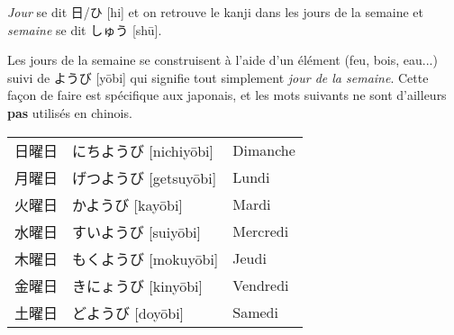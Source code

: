 \documentclass[a4paper,11pt,final]{article}
\newcommand{\sectit}[1]{\bigskip\hspace{-5mm}{\color{sectionblue}$\blacksquare$~~\Large\bfseries #1}}
\newcommand{\romaji}[1]{{\footnotesize[#1]}}
\begin{document}

\vspace{15mm}


\og\textit{Jour}\fg{} se dit 日/ひ \romaji{hi} et on retrouve le kanji dans les
jours de la semaine et \og\textit{semaine}\fg{} se dit しゅう \romaji{sh\=u}.


\sectit{De dimanche à samedi}

Les jours de la semaine se construisent à l'aide d'un élément (feu, bois,
eau...) suivi de ようび \romaji{y\=obi} qui signifie tout simplement
\og\textit{jour de la semaine}\fg. Cette façon de faire est spécifique aux
japonais, et les mots suivants ne sont d'ailleurs \textbf{pas} utilisés en
chinois.

\hspace{5mm}\begin{tabular}{|p{2cm}p{4.5cm}l}
    日曜日    & にちようび \romaji{nichiy\=obi}    & Dimanche \\
    月曜日    & げつようび \romaji{getsuy\=obi}    & Lundi \\
    火曜日    & かようび \romaji{kay\=obi}          & Mardi \\
    水曜日    & すいようび \romaji{suiy\=obi}      & Mercredi \\
    木曜日    & もくようび \romaji{mokuy\=obi}     & Jeudi \\
    金曜日    & きにょうび \romaji{kiny\=obi}      & Vendredi \\
    土曜日    & どようび \romaji{doy\=obi}          & Samedi
\end{tabular}
\end{document}
